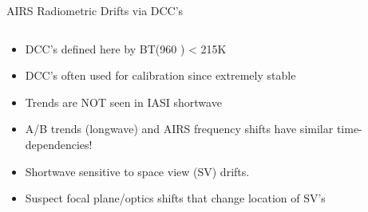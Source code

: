 \documentclass[10pt,t]{beamer}
\begin{document}
\begin{frame}[label={sec:org1248642}]{AIRS Radiometric Drifts via DCC's}
\begin{columns}
\begin{column}{0.58\columnwidth}
\begin{block}{}
\vspace{-0.15in}
\scriptsize
\begin{itemize}
\item DCC's defined here by BT(960 \wn) < 215K
\item DCC's often used for calibration since extremely stable
\item Trends are NOT seen in IASI shortwave
\item A/B trends (longwave) and AIRS frequency shifts have similar time-dependencies!
\item Shortwave sensitive to space view (SV) drifts.
\item Suspect focal plane/optics shifts that change location of SV's
\end{itemize}
\end{block}
\end{column}
\end{columns}
\end{frame}
\end{document}
